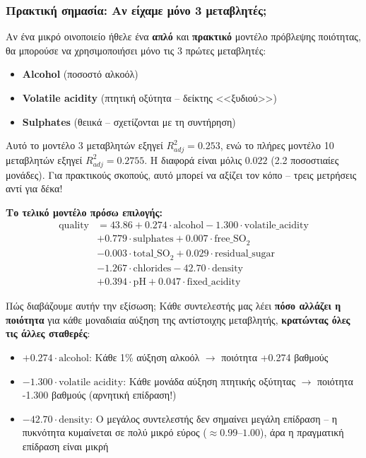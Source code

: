 \documentclass[12pt,a4paper]{article}
\begin{document}
\subsubsection{Πρακτική σημασία: Αν είχαμε μόνο 3 μεταβλητές;}

\begin{examplebox}
Αν ένα μικρό οινοποιείο ήθελε ένα \textbf{απλό} και \textbf{πρακτικό} μοντέλο πρόβλεψης ποιότητας, θα μπορούσε να χρησιμοποιήσει μόνο τις 3 πρώτες μεταβλητές:
\begin{itemize}
    \item \textbf{Alcohol} (ποσοστό αλκοόλ)
    \item \textbf{Volatile acidity} (πτητική οξύτητα -- δείκτης <<ξυδιού>>)
    \item \textbf{Sulphates} (θειικά -- σχετίζονται με τη συντήρηση)
\end{itemize}

Αυτό το μοντέλο 3 μεταβλητών εξηγεί $R^2_{adj} = 0.253$, ενώ το πλήρες μοντέλο 10 μεταβλητών εξηγεί $R^2_{adj} = 0.2755$. Η διαφορά είναι μόλις $0.022$ (2.2 ποσοστιαίες μονάδες). Για πρακτικούς σκοπούς, αυτό μπορεί να αξίζει τον κόπο -- τρεις μετρήσεις αντί για δέκα!
\end{examplebox}

\textbf{Το τελικό μοντέλο πρόσω επιλογής:}
\begin{align*}
\text{quality} &= 43.86 + 0.274 \cdot \text{alcohol} - 1.300 \cdot \text{volatile\_acidity} \\
&+ 0.779 \cdot \text{sulphates} + 0.007 \cdot \text{free\_SO}_2 \\
&- 0.003 \cdot \text{total\_SO}_2 + 0.029 \cdot \text{residual\_sugar} \\
&- 1.267 \cdot \text{chlorides} - 42.70 \cdot \text{density} \\
&+ 0.394 \cdot \text{pH} + 0.047 \cdot \text{fixed\_acidity}
\end{align*}

\begin{theorybox}
Πώς διαβάζουμε αυτήν την εξίσωση; Κάθε συντελεστής μας λέει \textbf{πόσο αλλάζει η ποιότητα} για κάθε μοναδιαία αύξηση της αντίστοιχης μεταβλητής, \textbf{κρατώντας όλες τις άλλες σταθερές}:
\begin{itemize}
    \item $+0.274 \cdot \text{alcohol}$: Κάθε 1\% αύξηση αλκοόλ $\to$ ποιότητα +0.274 βαθμούς
    \item $-1.300 \cdot \text{volatile acidity}$: Κάθε μονάδα αύξηση πτητικής οξύτητας $\to$ ποιότητα -1.300 βαθμούς (αρνητική επίδραση!)
    \item $-42.70 \cdot \text{density}$: Ο μεγάλος συντελεστής δεν σημαίνει μεγάλη επίδραση -- η πυκνότητα κυμαίνεται σε πολύ μικρό εύρος ($\approx 0.99$--$1.00$), άρα η πραγματική επίδραση είναι μικρή
\end{itemize}
\end{theorybox}
\end{document}
